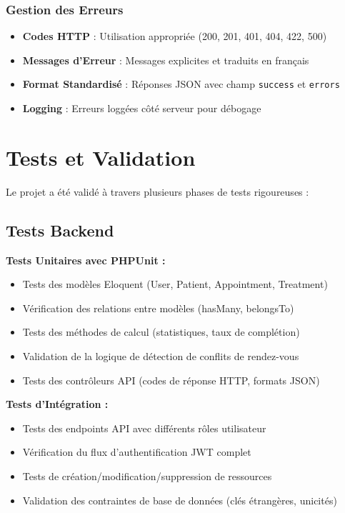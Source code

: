 \documentclass[12pt,a4paper]{report}
\begin{document}
\subsubsection{Gestion des Erreurs}

\begin{itemize}
    \item \textbf{Codes HTTP} : Utilisation appropriée (200, 201, 401, 404, 422, 500)
    \item \textbf{Messages d'Erreur} : Messages explicites et traduits en français
    \item \textbf{Format Standardisé} : Réponses JSON avec champ \texttt{success} et \texttt{errors}
    \item \textbf{Logging} : Erreurs loggées côté serveur pour débogage
\end{itemize}

\section{Tests et Validation}

Le projet a été validé à travers plusieurs phases de tests rigoureuses :

\subsection{Tests Backend}

\textbf{Tests Unitaires avec PHPUnit :}
\begin{itemize}
    \item Tests des modèles Eloquent (User, Patient, Appointment, Treatment)
    \item Vérification des relations entre modèles (hasMany, belongsTo)
    \item Tests des méthodes de calcul (statistiques, taux de complétion)
    \item Validation de la logique de détection de conflits de rendez-vous
    \item Tests des contrôleurs API (codes de réponse HTTP, formats JSON)
\end{itemize}

\textbf{Tests d'Intégration :}
\begin{itemize}
    \item Tests des endpoints API avec différents rôles utilisateur
    \item Vérification du flux d'authentification JWT complet
    \item Tests de création/modification/suppression de ressources
    \item Validation des contraintes de base de données (clés étrangères, unicités)
\end{itemize}
\end{document}
